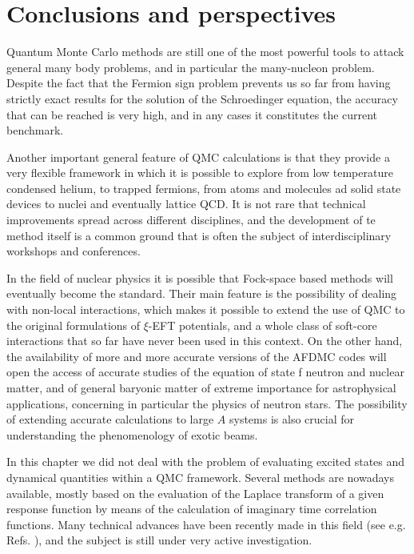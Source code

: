 \section{Conclusions and perspectives}

Quantum Monte Carlo methods are still one of the most powerful tools to attack general many body problems, and in particular the many-nucleon problem. Despite the fact that the Fermion sign problem prevents us so far from having strictly exact results for the solution of the Schroedinger equation, the accuracy that can be reached is very high, and in any cases it constitutes the current benchmark.

Another important general feature of QMC calculations is that they provide a very flexible framework in which it is possible to explore from low temperature condensed helium, to trapped fermions, from atoms and molecules ad solid state devices to nuclei and eventually lattice QCD. It is not rare that technical improvements spread across different disciplines, and the development of te method itself is a common ground that is often the subject of interdisciplinary workshops and conferences.  

In the field of nuclear physics it is possible that Fock-space based methods will eventually become the standard. Their main feature is the possibility of dealing with non-local interactions, which makes it possible to extend the use of QMC to the original formulations of $\xi$-EFT potentials, and a whole class of soft-core interactions that so far have never been used in this context. On the other hand, the availability of more and more accurate versions of the AFDMC codes will open the access of accurate studies of the equation of state f neutron and nuclear matter, and of general baryonic matter of extreme importance for astrophysical applications, concerning in particular the physics of neutron stars. The possibility of extending accurate calculations to large $A$ systems is also crucial for understanding the phenomenology of exotic beams.

In this chapter we did not deal with the problem of evaluating excited states and dynamical quantities within a QMC framework. Several methods are nowadays available, mostly based on the evaluation of the Laplace transform of a given response function by means of the calculation of imaginary time correlation functions. Many technical advances have been recently made in this field (see e.g. Refs. \cite{Galli, RoggeroHe, Lovato1,Lovato2}), and the subject is still under very active investigation. 

